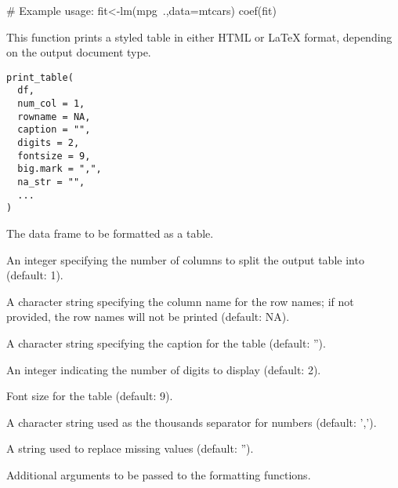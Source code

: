 \documentclass[a4paper]{book}
\begin{document}
%
\begin{Examples}
\begin{ExampleCode}
# Example usage:
fit<-lm(mpg~.,data=mtcars)
coef(fit)%

\end{ExampleCode}
\end{Examples}
%
\begin{Description}
This function prints a styled table in either HTML or LaTeX format, depending on the output document type.
\end{Description}
%
\begin{Usage}
\begin{verbatim}
print_table(
  df,
  num_col = 1,
  rowname = NA,
  caption = "",
  digits = 2,
  fontsize = 9,
  big.mark = ",",
  na_str = "",
  ...
)
\end{verbatim}
\end{Usage}
%
\begin{Arguments}
\begin{ldescription}
\item[\code{df}] The data frame to be formatted as a table.

\item[\code{num\_col}] An integer specifying the number of columns to split the output table into (default: 1).

\item[\code{rowname}] A character string specifying the column name for the row names; if not provided, the row names will not be printed (default: NA).

\item[\code{caption}] A character string specifying the caption for the table (default: '').

\item[\code{digits}] An integer indicating the number of digits to display (default: 2).

\item[\code{fontsize}] Font size for the table (default: 9).

\item[\code{big.mark}] A character string used as the thousands separator for numbers (default: ',').

\item[\code{na\_str}] A string used to replace missing values (default: '').

\item[\code{...}] Additional arguments to be passed to the formatting functions.
\end{ldescription}
\end{Arguments}
\end{document}
